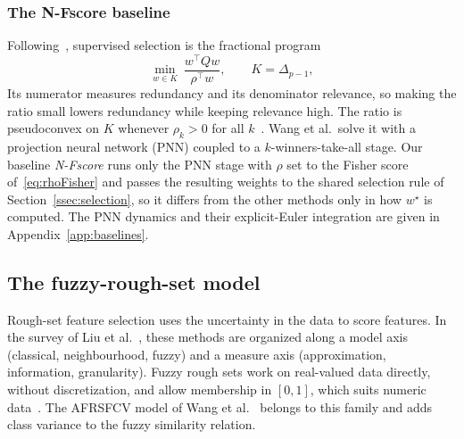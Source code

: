 \documentclass[]{interact}
\theoremstyle{plain}
\theoremstyle{definition}
\theoremstyle{remark}
\begin{document}
\subsubsection{The N-Fscore baseline}\label{sssec:nfscore}
Following~\citep{wang2021fractional}, supervised selection is the fractional program
\begin{equation}\label{eq:wangOrig}
\min_{w\in K}\ \frac{w^{\top}Qw}{\rho^{\top}w},\qquad K=\Delta_{p-1},
\end{equation}
Its numerator measures redundancy and its denominator relevance, so making the ratio small lowers redundancy while keeping relevance high. The ratio is pseudoconvex on $K$ whenever $\rho_k>0$ for all $k$~\citep{wang2021fractional}. Wang et al.\ solve it with a projection neural network (PNN) coupled to a $k$-winners-take-all stage. Our baseline \emph{N-Fscore} runs only the PNN stage with $\rho$ set to the Fisher score of~\eqref{eq:rhoFisher} and passes the resulting weights to the shared selection rule of Section~\ref{ssec:selection}, so it differs from the other methods only in how $w^\star$ is computed. The PNN dynamics and their explicit-Euler integration are given in Appendix~\ref{app:baselines}.

\subsection{The fuzzy-rough-set model}\label{ssec:afrsfcv}
Rough-set feature selection uses the uncertainty in the data to score features. In the survey of Liu et al.~\citep{liu2026rfs}, these methods are organized along a model axis (classical, neighbourhood, fuzzy) and a measure axis (approximation, information, granularity). Fuzzy rough sets work on real-valued data directly, without discretization, and allow membership in $[0,1]$, which suits numeric data~\citep{jensen2009}. The AFRSFCV model of Wang et al.~\citep{wang2026afrsfcv} belongs to this family and adds class variance to the fuzzy similarity relation.
\end{document}
